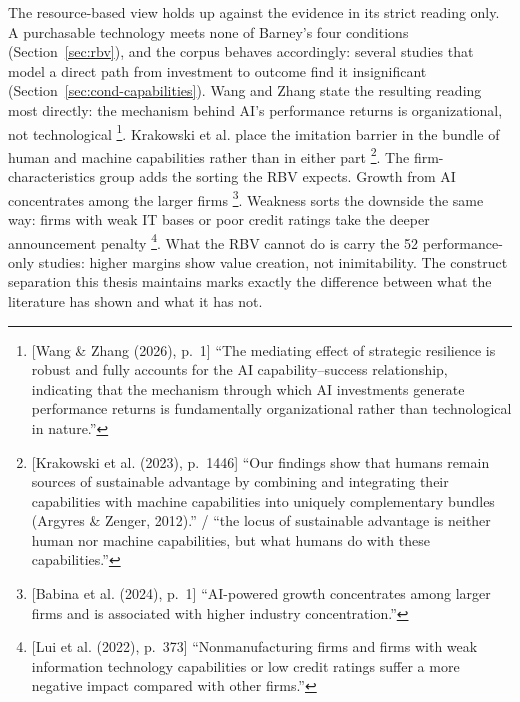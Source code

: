 The resource-based view holds up against the evidence in its strict reading only.
A purchasable technology meets none of Barney's four conditions
(Section~\ref{sec:rbv}), and the corpus behaves accordingly: several studies that model
a direct path from investment to outcome find it insignificant
(Section~\ref{sec:cond-capabilities}). Wang and Zhang state the resulting reading most
directly: the mechanism behind AI's performance returns is organizational, not
technological \parencite[p.~1]{wang2026artificial}\footnote{[Wang \& Zhang (2026),
p.~1] ``The mediating effect of strategic resilience is robust and fully accounts for
the AI capability--success relationship, indicating that the mechanism through which AI
investments generate performance returns is fundamentally organizational rather than
technological in nature.''}. Krakowski et al. place the imitation barrier in the bundle
of human and machine capabilities rather than in either
part \parencite[p.~1446]{krakowski2023artificial}\footnote{[Krakowski et al. (2023),
p.~1446] ``Our findings show that humans remain sources of sustainable advantage by
combining and integrating their capabilities with machine capabilities into uniquely
complementary bundles (Argyres \& Zenger, 2012).'' / ``the locus of sustainable
advantage is neither human nor machine capabilities, but what humans do with these
capabilities.''}. The firm-characteristics group adds the sorting the RBV expects.
Growth from AI concentrates among the larger
firms \parencite[p.~1]{babina2024artificial}\footnote{[Babina et al. (2024), p.~1]
``AI-powered growth concentrates among larger firms and is associated with higher
industry concentration.''}. Weakness sorts the downside the same way: firms with
weak IT bases or poor credit ratings take the deeper announcement
penalty \parencite[p.~373]{lui2022impact}\footnote{[Lui et al. (2022), p.~373]
``Nonmanufacturing firms and firms with weak information technology capabilities or low
credit ratings suffer a more negative impact compared with other firms.''}. What the
RBV cannot do is carry the 52 performance-only studies: higher margins show value
creation, not inimitability. The construct separation this thesis maintains marks
exactly the difference between what the literature has shown and what it has not.

